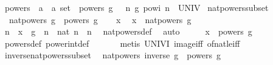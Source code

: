 \begin{isabellebody}
\ powers\ {\isacharcolon}{\kern0pt}{\isacharcolon}{\kern0pt}\ {\isachardoublequoteopen}{\isacharprime}{\kern0pt}a\ {\isasymRightarrow}\ {\isacharprime}{\kern0pt}a\ set{\isachardoublequoteclose}\ \ {\isachardoublequoteopen}powers\ g\ {\isacharequal}{\kern0pt}\ {\isacharparenleft}{\kern0pt}{\isacharparenleft}{\kern0pt}{\isasymlambda}\ n{\isachardot}{\kern0pt}\ g\ powi\ n{\isacharparenright}{\kern0pt}\ {\isacharbackquote}{\kern0pt}\ UNIV{\isacharparenright}{\kern0pt}{\isachardoublequoteclose}\isanewline
\isanewline
{}\isamarkupfalse%
\ nat{\isacharunderscore}{\kern0pt}powers{\isacharunderscore}{\kern0pt}subset{\isacharcolon}{\kern0pt}\isanewline
\ \ {\isachardoublequoteopen}nat{\isacharunderscore}{\kern0pt}powers\ g\ {\isasymsubseteq}\ powers\ g{\isachardoublequoteclose}\isanewline
%
\isadelimproof
%
\endisadelimproof
%
\isatagproof
{}\isamarkupfalse%
\isanewline
\ \ \isamarkupfalse%
\ x\ \isamarkupfalse%
\ {\isachardoublequoteopen}x\ {\isasymin}\ nat{\isacharunderscore}{\kern0pt}powers\ g{\isachardoublequoteclose}\isanewline
\ \ \isamarkupfalse%
\ \isamarkupfalse%
\ n\ \ {\isachardoublequoteopen}x\ {\isacharequal}{\kern0pt}\ g\ {\isacharcircum}{\kern0pt}\ n{\isachardoublequoteclose}\ \ {\isachardoublequoteopen}nat\ n\ {\isacharequal}{\kern0pt}\ n{\isachardoublequoteclose}\ \isamarkupfalse%
\ nat{\isacharunderscore}{\kern0pt}powers{\isacharunderscore}{\kern0pt}def\ \isamarkupfalse%
\ auto\isanewline
\ \ \isamarkupfalse%
\ \isamarkupfalse%
\ {\isachardoublequoteopen}x\ {\isasymin}\ powers\ g{\isachardoublequoteclose}\ \isamarkupfalse%
\ powers{\isacharunderscore}{\kern0pt}def\ power{\isacharunderscore}{\kern0pt}int{\isacharunderscore}{\kern0pt}def\ \isanewline
\ \ \ \ \isamarkupfalse%
\ {\isacharparenleft}{\kern0pt}metis\ UNIV{\isacharunderscore}{\kern0pt}I\ image{\isacharunderscore}{\kern0pt}iff\ of{\isacharunderscore}{\kern0pt}nat{\isacharunderscore}{\kern0pt}{}{\isacharunderscore}{\kern0pt}le{\isacharunderscore}{\kern0pt}iff{\isacharparenright}{\kern0pt}\isanewline
{}\isamarkupfalse%
%
\endisatagproof
{\isafoldproof}%
%
\isadelimproof
\isanewline
%
\endisadelimproof
\isanewline
{}\isamarkupfalse%
\ inverse{\isacharunderscore}{\kern0pt}nat{\isacharunderscore}{\kern0pt}powers{\isacharunderscore}{\kern0pt}subset{\isacharcolon}{\kern0pt}\isanewline
\ \ {\isachardoublequoteopen}nat{\isacharunderscore}{\kern0pt}powers\ {\isacharparenleft}{\kern0pt}inverse\ g{\isacharparenright}{\kern0pt}\ {\isasymsubseteq}\ powers\ g{\isachardoublequoteclose}\isanewline

\end{isabellebody}
